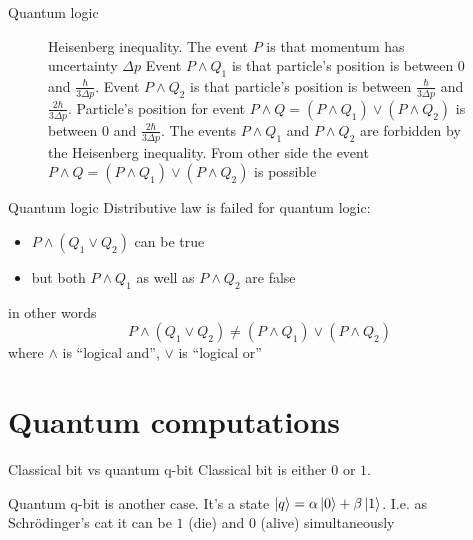 \documentclass[10pt,pdf,hyperref={unicode}]{beamer}
\begin{document}
\begin{frame}{Quantum logic}
\begin{figure}[H]
  \centering
  \caption{Heisenberg inequality. The event $P$ is that momentum has
    uncertainty $\Delta p$ Event $P \land Q_1$ is that particle's
    position is between $0$ and $\frac{\hbar}{3 \Delta p}$. Event
    $P \land Q_2$ is that particle's
    position is between $\frac{\hbar}{3 \Delta p}$ and
    $\frac{2\hbar}{3 \Delta p}$. Particle's position for event $P
    \land Q = (P \land Q_1)
    \lor (P \land Q_2)$ is between $0$ and $\frac{2\hbar}{3 \Delta p}$. The
    events $P \land Q_1$ and $P \land Q_2$ are forbidden by the Heisenberg
    inequality. From other side the event $P \land Q = (P \land Q_1)
    \lor (P \land Q_2)$ is possible}   
\end{figure}
\end{frame}

\begin{frame}{Quantum logic}
  Distributive law is failed for quantum logic:
  \begin{itemize}
  \item $P \land (Q_1 \lor Q_2)$ can be true
  \item but both $P \land Q_1$ as well as $P \land Q_2$ are false
  \end{itemize}
  in other words
  \[
  P \land (Q_1 \lor Q_2) \ne (P \land Q_1) \lor (P \land Q_2)
  \]
  where $\land$ is ``logical and'', $\lor$ is ``logical or''
\end{frame}

\section{Quantum computations}
\begin{frame}{Classical bit vs quantum q-bit}
  Classical bit is either $0$ or $1$.

  Quantum q-bit is another case. It's a state
  $\ket{q} = \alpha \ket{0} + \beta \ket{1}$. I.e. as Schrödinger's
  cat it can be $1$ (die) and $0$ (alive) simultaneously
\end{frame}
\end{document}
